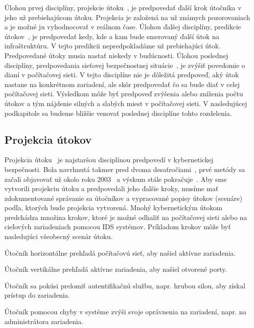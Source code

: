 \documentclass[thesismargins, thesislinespacing, openright, upjsfrontpage, combineabstracts]{rnthesis}
\begin{document}
Úlohou prvej disciplíny, projekcie útoku~\cite{Yang2014}, je predpovedať ďalší krok útočníka v jeho už prebiehajúcom útoku. Projekcia je založená na už známych pozorovaniach a je možné ju vyhodnocovať v reálnom čase. Úlohou ďalšej disciplíny, predikcie útokov~\cite{Abdlhamed2017}, je predpovedať kedy, kde a kam bude smerovaný ďalší útok na infraštruktúru. V tejto predikcii nepredpokladáme už prebiehajúci útok. Predpovedané útoky musia nastať niekedy v budúcnosti. Úlohou poslednej disciplíny, predpovedania sieťovej bezpečnostnej situácie~\cite{wei2013comprehensive,Leau2015}, je zvýšiť povedomie o dianí v počítačovej sieti. V tejto disciplíne nie je dôležitá predpoveď, aký útok nastane na konkrétnom zariadení, ale skôr predpovedať čo sa bude diať v celej počítačovej sieti. Výsledkom môže byť predpoveď zvýšenia alebo zníženia počtu útokov a tým nájdenie silných a slabých miest v počítačovej sieti. V nasledujúcej podkapitole sa budeme bližšie venovať poslednej disciplíne tohto rozdelenia.

\subsection{Projekcia útokov}

Projekcia útoku~\cite{Yang2014} je najstaršou disciplínou predpovedí v kybernetickej bezpečnosti. Bola navrhnutá takmer pred dvoma desaťročiami~\cite{geib2001plan}, prvé metódy sa začali objavovať už okolo roku 2003~\cite{hughes2003attack,qin2004attack} a výskum stále pokračuje~\cite{ahmed2017attack,zhang2019intrusion}. Aby sme vytvorili projekciu útoku a predpovedali jeho ďalšie kroky, musíme mať zdokumentované správanie sa útočníkov a vypracované popisy útokov (scenáre) podľa, ktorých bude projekcia vytvorená. Mnohý kybernetickým útokom predchádza množina krokov, ktoré je možné odhaliť na počítačovej sieti alebo na cieľových zariadeniach pomocou IDS systémov. Príkladom krokov môže byť nasledujúci všeobecný scenár útoku.

\begin{compactenum}
    \item Útočník horizontálne prehľadá počítačovú sieť, aby našiel aktívne zariadenia.
    \item Útočník vertikálne prehľadá aktívne zariadenia, aby našiel otvorené porty.
    \item Útočník sa pokúsi prelomiť autentifikačnú službu, napr. hrubou silou, aby získal prístup do zariadenia.
    \item Útočník pomocou chyby v systéme zvýši svoje oprávnenia na zariadení, napr. na administrátora zariadenia.
\end{compactenum}
\end{document}
